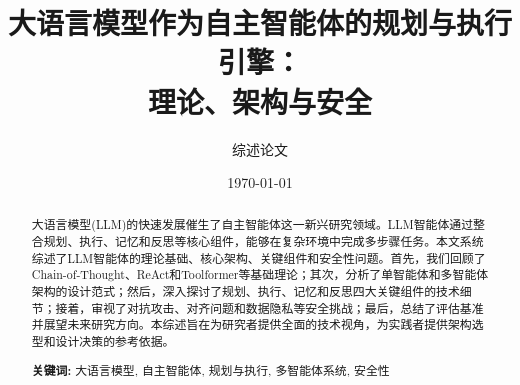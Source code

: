\documentclass[11pt,a4paper]{article}
\title{\textbf{大语言模型作为自主智能体的规划与执行引擎：\\理论、架构与安全}}
\author{综述论文}
\date{\today}
\theoremstyle{definition}
\begin{document}
\maketitle

\begin{abstract}
大语言模型(LLM)的快速发展催生了自主智能体这一新兴研究领域。LLM智能体通过整合规划、执行、记忆和反思等核心组件，能够在复杂环境中完成多步骤任务。本文系统综述了LLM智能体的理论基础、核心架构、关键组件和安全性问题。首先，我们回顾了Chain-of-Thought、ReAct和Toolformer等基础理论；其次，分析了单智能体和多智能体架构的设计范式；然后，深入探讨了规划、执行、记忆和反思四大关键组件的技术细节；接着，审视了对抗攻击、对齐问题和数据隐私等安全挑战；最后，总结了评估基准并展望未来研究方向。本综述旨在为研究者提供全面的技术视角，为实践者提供架构选型和设计决策的参考依据。

\vspace{1em}
\noindent\textbf{关键词:} 大语言模型, 自主智能体, 规划与执行, 多智能体系统, 安全性
\end{abstract}

\tableofcontents
\newpage














\end{document}
